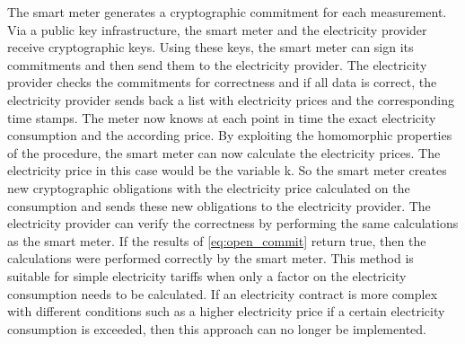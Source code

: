 The smart meter generates a cryptographic commitment for each measurement. Via a public key infrastructure, the smart meter and the electricity provider receive cryptographic keys. Using these keys, the smart meter can sign its commitments and then send them to the electricity provider. The electricity provider checks the commitments for correctness and if all data is correct, the electricity provider sends back a list with electricity prices and the corresponding time stamps. The meter now knows at each point in time the exact electricity consumption and the according price. By exploiting the homomorphic properties of the procedure, the smart meter can now calculate the electricity prices. The electricity price in this case would be the variable k. So the smart meter creates new cryptographic obligations with the electricity price calculated on the consumption and sends these new obligations to the electricity provider. The electricity provider can verify the correctness by performing the same calculations as the smart meter. If the results of \ref{eq:open_commit} return true, then the calculations were performed correctly by the smart meter.
This method is suitable for simple electricity tariffs when only a factor on the electricity consumption needs to be calculated. If an electricity contract is more complex with different conditions such as a higher electricity price if a certain electricity consumption is exceeded, then this approach can no longer be implemented.
